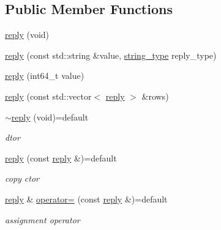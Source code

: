 \subsection*{Public Member Functions}
\begin{DoxyCompactItemize}
\item 
\hyperlink{classcpp__redis_1_1reply_a8d0b1f8a18b5c7c3ce79784604dba6cc}{reply} (void)
\item 
\hyperlink{classcpp__redis_1_1reply_a58fb2a051a001f1c3dcf2cd957441dbc}{reply} (const std\+::string \&value, \hyperlink{classcpp__redis_1_1reply_ac192ba4cb8f2bb6e7cb465edf755328b}{string\+\_\+type} reply\+\_\+type)
\item 
\hyperlink{classcpp__redis_1_1reply_a6200b9fa76196e75fb18aa07e47391f0}{reply} (int64\+\_\+t value)
\item 
\hyperlink{classcpp__redis_1_1reply_af3e08b6b795978757a05a1ac4bb08c68}{reply} (const std\+::vector$<$ \hyperlink{classcpp__redis_1_1reply}{reply} $>$ \&rows)
\item 
\mbox{\label{classcpp__redis_1_1reply_a1acfe6cbc763368cc2a9eef25afffe35}} 
\hyperlink{classcpp__redis_1_1reply_a1acfe6cbc763368cc2a9eef25afffe35}{$\sim$reply} (void)=default
\begin{DoxyCompactList}\small\item\em dtor \end{DoxyCompactList}\item 
\mbox{\label{classcpp__redis_1_1reply_a247955712c519daffcf740ae163e69bb}} 
\hyperlink{classcpp__redis_1_1reply_a247955712c519daffcf740ae163e69bb}{reply} (const \hyperlink{classcpp__redis_1_1reply}{reply} \&)=default
\begin{DoxyCompactList}\small\item\em copy ctor \end{DoxyCompactList}\item 
\mbox{\label{classcpp__redis_1_1reply_a3482157af73f4a60a6386f057e484e5b}} 
\hyperlink{classcpp__redis_1_1reply}{reply} \& \hyperlink{classcpp__redis_1_1reply_a3482157af73f4a60a6386f057e484e5b}{operator=} (const \hyperlink{classcpp__redis_1_1reply}{reply} \&)=default
\begin{DoxyCompactList}\small\item\em assignment operator \end{DoxyCompactList}\item 

\end{DoxyCompactItemize}
